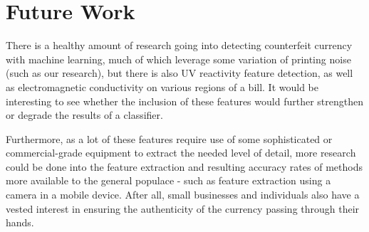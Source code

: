 \documentclass{article}
\begin{document}
\section{Future Work}
There is a healthy amount of research going into detecting counterfeit currency with machine learning, much of which leverage some variation of printing noise (such as our research), but there is also UV reactivity feature detection, as well as electromagnetic conductivity on various regions of a bill. It would be interesting to see whether the inclusion of these features would further strengthen or degrade the results of a classifier.

Furthermore, as a lot of these features require use of some sophisticated or commercial-grade equipment to extract the needed level of detail, more research could be done into the feature extraction and resulting accuracy rates of methods more available to the general populace - such as feature extraction using a camera in a mobile device. After all, small businesses and individuals also have a vested interest in ensuring the authenticity of the currency passing through their hands.
\end{document}
